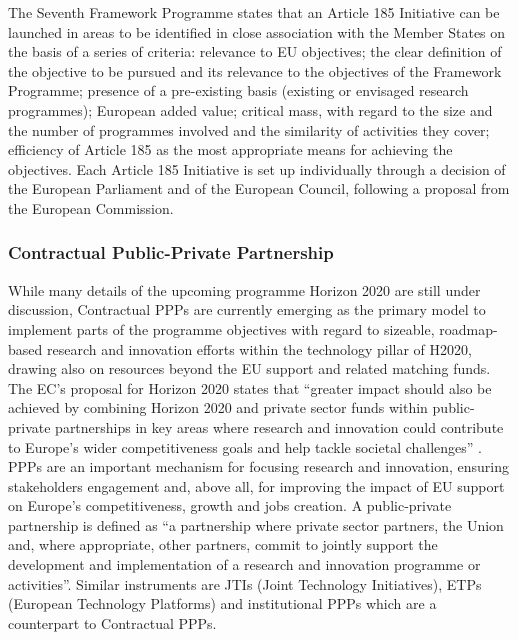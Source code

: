 \documentclass[10pt, plain]{../../metanetpaper}
\begin{document}
\begin{multicols}{2}
The Seventh Framework Programme states that an Article 185 Initiative can be launched in areas to be identified in close association with the Member States on the basis of a series of criteria: relevance to EU objectives; the clear definition of the objective to be pursued and its relevance to the objectives of the Framework Programme; presence of a pre-existing basis (existing or envisaged research programmes); European added value; critical mass, with regard to the size and the number of programmes involved and the similarity of activities they cover; efficiency of Article 185 as the most appropriate means for achieving the objectives. Each Article 185 Initiative is set up individually through a decision of the European Parliament and of the European Council, following a proposal from the European Commission.


\subsubsection{Contractual Public-Private Partnership}
\label{sec:contr-ppp}

While many details of the upcoming programme Horizon 2020 are still under discussion, Contractual PPPs are currently emerging as the primary model to implement parts of the programme objectives with regard to sizeable, roadmap-based research and innovation efforts within the technology pillar of H2020, drawing also on resources beyond the EU support and related matching funds. The EC's proposal for Horizon 2020 states that ``greater impact should also be achieved by combining Horizon 2020 and private sector funds within public-private partnerships in key areas where research and innovation could contribute to Europe's wider competitiveness goals and help tackle societal challenges'' \cite{H2020prop}.  PPPs are an important mechanism for focusing research and innovation, ensuring stakeholders engagement and, above all, for improving the impact of EU support on Europe's competitiveness, growth and jobs creation. A public-private partnership is defined as ``a partnership where private sector partners, the Union and, where appropriate, other partners, commit to jointly support the development and implementation of a research and innovation programme or activities''. Similar instruments are JTIs (Joint Technology Initiatives), ETPs (European Technology Platforms) and institutional PPPs which are a counterpart to Contractual PPPs.


\end{multicols}
\end{document}
